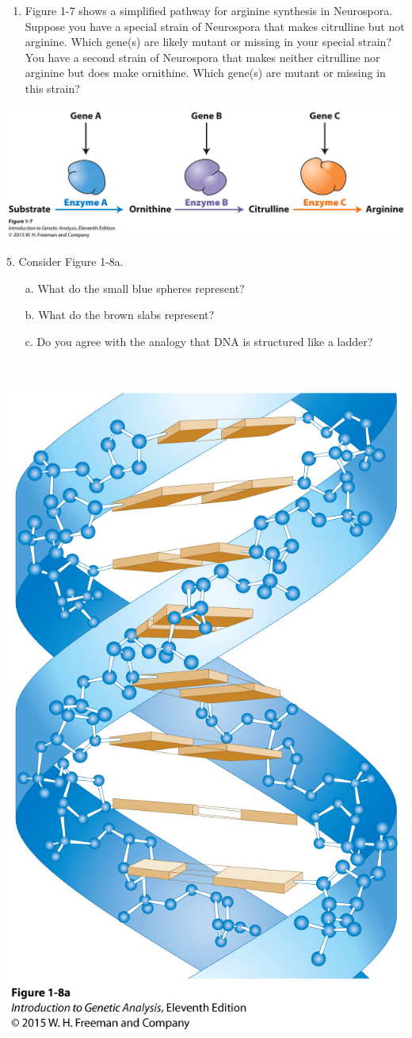 \documentclass[11pt,]{article}
\providecommand{\tightlist}{%
  \setlength{\itemsep}{0pt}\setlength{\parskip}{0pt}}
\begin{document}
\begin{blackbox}

\begin{enumerate}
\def\labelenumi{\arabic{enumi}.}
\setcounter{enumi}{3}
\tightlist
\item
  Figure 1-7 shows a simplified pathway for arginine synthesis in
  Neurospora. Suppose you have a special strain of Neurospora that makes
  citrulline but not arginine. Which gene(s) are likely mutant or
  missing in your special strain? You have a second strain of Neurospora
  that makes neither citrulline nor arginine but does make ornithine.
  Which gene(s) are mutant or missing in this strain?\\
\end{enumerate}

\begin{center}\includegraphics[width=0.45\linewidth,]{input/figure_01_07} \end{center}

\vspace{17cm}

\end{blackbox}

\begin{blackbox}
5. Consider Figure 1-8a. \begin{enumerate} 
 \item[a.]{ What do the small blue spheres represent? } 
 \item[b.]{ What do the brown slabs represent? } 
 \item[c.]{ Do you agree with the analogy that DNA is structured like a ladder? } 
 \end{enumerate}

\


\begin{center}\includegraphics[width=0.25\linewidth,]{input/figure_01_08a} \end{center}


\vspace{14cm}

\end{blackbox}
\end{document}
